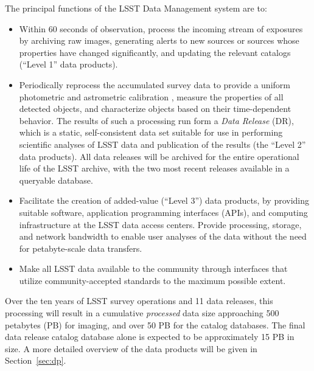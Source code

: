 \documentclass[11pt,twoside]{article}
\begin{document}
The principal functions of the LSST Data Management system are to:
\begin{itemize}
\item Within 60 seconds of observation, process the incoming stream of exposures by archiving raw images, generating alerts to new sources or sources whose properties have changed significantly, and updating the relevant catalogs (``Level 1'' data products).
\item Periodically reprocess the accumulated survey data to provide a
  uniform photometric and astrometric calibration \citep[e.g.,][]{LSE-180}, measure the
  properties of all detected objects, and characterize objects based on their time-dependent behavior. The results of such a processing run form a {\em Data Release} (DR), which is a static, self-consistent data set suitable for use in performing scientific analyses of LSST data and publication of the results (the ``Level 2'' data products). All data releases will be archived for the entire operational life of the LSST
archive, with the two most recent releases available in a
queryable database.
\item Facilitate the creation of added-value (``Level 3'') data products, by providing suitable software,
  application programming interfaces (APIs),
and computing infrastructure at the LSST data access centers. Provide
  processing, storage, and network bandwidth to enable user
  analyses of the data without the need for petabyte-scale data
  transfers.
\item Make all LSST data available to the community through interfaces that utilize
community-accepted standards   to the maximum possible extent. 
\end{itemize}

Over the ten years of LSST survey operations and 11 data releases, this processing will result in a cumulative {\em processed} data size
approaching 500 petabytes (PB) for imaging, and over 50 PB for the
catalog databases. The final data release catalog database alone is expected
to be approximately 15 PB in size. A more detailed overview of the data products will be given in
Section~\ref{sec:dp}.
\\
\end{document}
